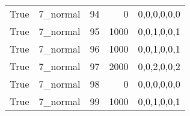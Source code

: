 \begin{tabular}{llrrl}
 True            & 7\_normal            &            94 &                     0 & 0,0,0,0,0,0   \\
 True            & 7\_normal            &            95 &                  1000 & 0,0,1,0,0,1   \\
 True            & 7\_normal            &            96 &                  1000 & 0,0,1,0,0,1   \\
 True            & 7\_normal            &            97 &                  2000 & 0,0,2,0,0,2   \\
 True            & 7\_normal            &            98 &                     0 & 0,0,0,0,0,0   \\
 True            & 7\_normal            &            99 &                  1000 & 0,0,1,0,0,1   \\
\hline
\end{tabular}